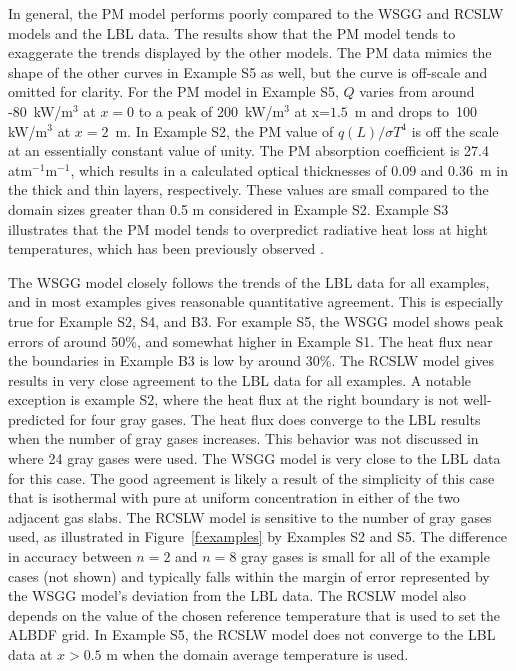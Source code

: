 \documentclass[preprint,12pt]{elsarticle}
\begin{document}
In general, the PM model performs poorly compared to the WSGG and RCSLW models and the LBL data. The results show that the PM model tends to exaggerate the trends displayed by the other models. The PM data mimics the shape of the other curves in Example S5 as well, but the curve is off-scale and omitted for clarity. For the PM model in Example S5, $Q$ varies from around -80~kW/m$^3$ at $x=0$ to a peak of 200~kW/m$^3$ at x=$1.5$~m and drops to~100 kW/m$^3$ at $x=2$~m. 
In Example S2, the PM value of $q(L)/\sigma T^4$ is off the scale at an essentially constant value of unity. The PM absorption coefficient is 27.4 atm$^{-1}$m$^{-1}$, which results in a calculated optical thicknesses of 0.09 and 0.36~m in the thick and thin layers, respectively. These values are small compared to the domain sizes greater than 0.5 m considered in Example S2.
Example S3 illustrates that the PM model tends to overpredict radiative heat loss at hight temperatures, which has been previously observed \cite{Frank_2000,Zhu_2002,Coelho_2002}. %

The WSGG model closely follows the trends of the LBL data for all examples, and in most examples gives reasonable quantitative agreement. This is especially true for Example S2, S4, and B3. For example S5, the WSGG model shows peak errors of around 50\%, and somewhat higher in Example S1. The heat flux near the boundaries in Example B3 is low by around 30\%. The RCSLW model gives results in very close agreement to the LBL data for all examples. A notable exception is example S2, where the heat flux at the right boundary is not well-predicted for four gray gases. The heat flux does converge to the LBL results when the number of gray gases increases. This behavior was not discussed in \cite{Solovjov_2017} where 24 gray gases were used. The WSGG model is very close to the LBL data for this case. The good agreement is likely a result of the simplicity of this case that is isothermal with pure  at uniform concentration in either of the two adjacent gas slabs.
The RCSLW model is sensitive to the number of gray gases used, as illustrated in Figure~\ref{f:examples} by Examples S2 and S5. The difference in accuracy between $n=2$ and $n=8$ gray gases is small for all of the example cases (not shown) and typically falls within the margin of error represented by the WSGG model's deviation from the LBL data. 
The RCSLW model also depends on the value of the chosen reference temperature that is used to set the ALBDF grid. In Example S5, the RCSLW model does not converge to the LBL data at $x>0.5$ m when the domain average temperature is used.
\end{document}
